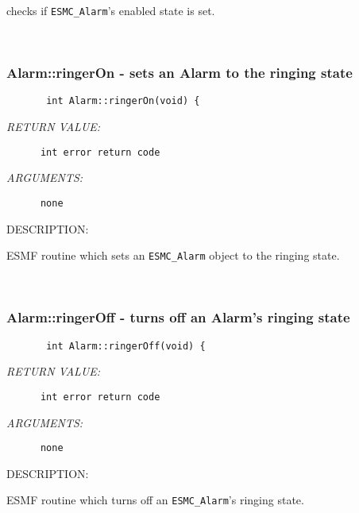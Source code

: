       checks if {\tt ESMC\_Alarm}'s enabled state is set.
   
 
\mbox{}\hrulefill\ 
 
\subsubsection [Alarm::ringerOn] {Alarm::ringerOn - sets an Alarm to the ringing state}


  
\begin{verbatim}       int Alarm::ringerOn(void) {\end{verbatim}{\em RETURN VALUE:}
\begin{verbatim}      int error return code\end{verbatim}{\em ARGUMENTS:}
\begin{verbatim}      none\end{verbatim}
{\sf DESCRIPTION:\\ }


        ESMF routine which sets an {\tt ESMC\_Alarm} object to the
        ringing state.
   
 
\mbox{}\hrulefill\ 
 
\subsubsection [Alarm::ringerOff] {Alarm::ringerOff - turns off an Alarm's ringing state}


  
\begin{verbatim}       int Alarm::ringerOff(void) {\end{verbatim}{\em RETURN VALUE:}
\begin{verbatim}      int error return code\end{verbatim}{\em ARGUMENTS:}
\begin{verbatim}      none\end{verbatim}
{\sf DESCRIPTION:\\ }


        ESMF routine which turns off an {\tt ESMC\_Alarm}'s ringing state.
   
 
\mbox{}\hrulefill\ 
 
